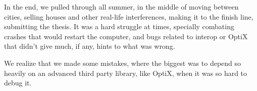 In the end, we pulled through all summer, in the middle of moving between cities, selling houses and other real-life interferences, making it to the finish line, submitting the thesis. It was a hard struggle at times, specially combating crashes that would restart the computer, and bugs related to interop or OptiX that didn't give much, if any, hints to what was wrong.

We realize that we made some mistakes, where the biggest was to depend so heavily on an advanced third party library, like OptiX, when it was so hard to debug it.